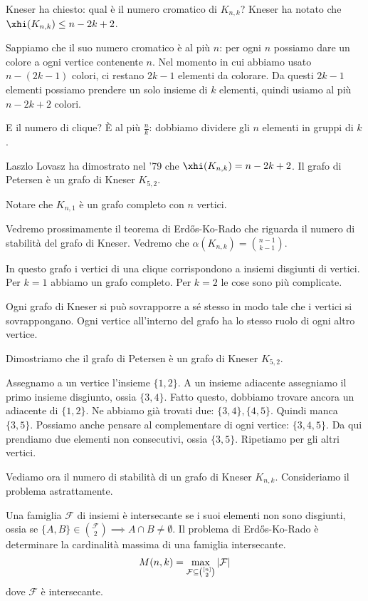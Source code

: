 		Kneser ha chiesto: qual \`e il numero cromatico di $K_{n,k}$?
		Kneser ha notato che $\xhi(K_{n,k}) \le n - 2k + 2$.

		Sappiamo che il suo numero cromatico \`e al pi\`u $n$: per ogni $n$ possiamo dare un colore a ogni vertice contenente $n$.
		Nel momento in cui abbiamo usato $n - (2k - 1)$ colori, ci restano $2k -1$ elementi da colorare.
		Da questi $2k -1$ elementi possiamo prendere un solo insieme di $k$ elementi, quindi usiamo al pi\`u $n - 2k +2$ colori.

		E il numero di clique?
		\`E al pi\`u $\frac{n}{k}$: dobbiamo dividere gli $n$ elementi in gruppi di $k$.

		Laszlo Lovasz ha dimostrato nel '79 che $\xhi(K_{n,k}) = n - 2k +2$.
		Il grafo di Petersen \`e un grafo di Kneser $K_{5,2}$.

		Notare che $K_{n,1}$ \`e un grafo completo con $n$ vertici.

		Vedremo prossimamente il teorema di Erd\H{o}s-Ko-Rado che riguarda il numero di stabilit\`a del grafo di Kneser.
		Vedremo che $\alpha (K_{n,k}) = \binom{n-1}{k-1}$.

		In questo grafo i vertici di una clique corrispondono a insiemi disgiunti di vertici.
		Per $k = 1$ abbiamo un grafo completo.
		Per $k = 2$ le cose sono pi\`u complicate.

		Ogni grafo di Kneser si pu\`o sovrapporre a s\'e stesso in modo tale che i vertici si sovrappongano.
		Ogni vertice all'interno del grafo ha lo stesso ruolo di ogni altro vertice.

		Dimostriamo che il grafo di Petersen \`e un grafo di Kneser $K_{5,2}$.

		Assegnamo a un vertice l'insieme $\{1,2\}$.
		A un insieme adiacente assegniamo il primo insieme disgiunto, ossia $\{3,4\}$.
		Fatto questo, dobbiamo trovare ancora un adiacente di $\{1,2\}$.
		Ne abbiamo gi\`a trovati due: $\{3,4\}, \{4,5\}$.
		Quindi manca $\{3,5\}$.
		Possiamo anche pensare al complementare di ogni vertice: $\{3,4,5\}$.
		Da qui prendiamo due elementi non consecutivi, ossia $\{3,5\}$.
		Ripetiamo per gli altri vertici.


		Vediamo ora il numero di stabilit\`a di un grafo di Kneser $K_{n,k}$.
		Consideriamo il problema astrattamente.

		Una famiglia $\mathcal{F}$ di insiemi \`e intersecante se i suoi elementi non sono disgiunti, ossia se $\{A,B\} \in \binom{\mathcal{F}}{2} \implies A \cap B \neq \emptyset$.
		Il problema di Erd\H{o}s-Ko-Rado \`e determinare la cardinalit\`a massima di una famiglia intersecante.
		\[
			M(n,k) = \max\limits_{\mathcal{F}\subseteq\binom{[n]}{2}} \left\lvert{\mathcal{F}}\right\rvert
		\]
		dove $\mathcal{F}$ \`e intersecante.

